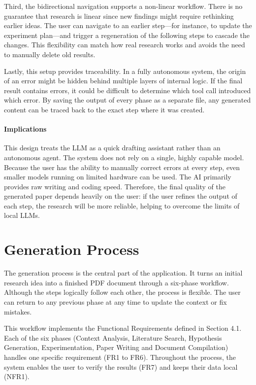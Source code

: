 Third, the bidirectional navigation supports a non-linear workflow.
There is no guarantee that research is linear since new findings might require rethinking earlier ideas.
The user can navigate to an earlier step---for instance, to update the experiment plan---and trigger a regeneration of the following steps to cascade the changes. 
This flexibility can match how real research works and avoids the need to manually delete old results.

Lastly, this setup provides traceability. 
In a fully autonomous system, the origin of an error might be hidden behind multiple layers of internal logic. 
If the final result contains errors, it could be difficult to determine which tool call introduced which error. 
By saving the output of every phase as a separate file, any generated content can be traced back to the exact step where it was created.


\paragraph{Implications}
This design treats the LLM as a quick drafting assistant rather than an autonomous agent. 
The system does not rely on a single, highly capable model. 
Because the user has the ability to manually correct errors at every step, even smaller models running on limited hardware can be used. 
The AI primarily provides raw writing and coding speed. 
Therefore, the final quality of the generated paper depends heavily on the user: 
if the user refines the output of each step, the research will be more reliable, helping to overcome the limits of local LLMs.




\section{Generation Process}
The generation process is the central part of the application. 
It turns an initial research idea into a finished PDF document through a six-phase workflow. 
Although the steps logically follow each other, the process is flexible. 
The user can return to any previous phase at any time to update the context or fix mistakes.

This workflow implements the Functional Requirements defined in Section 4.1. 
Each of the six phases (Context Analysis, Literature Search, Hypothesis Generation, Experimentation, Paper Writing and Document Compilation) handles one specific requirement (FR1 to FR6). 
Throughout the process, the system enables the user to verify the results (FR7) and keeps their data local (NFR1).

